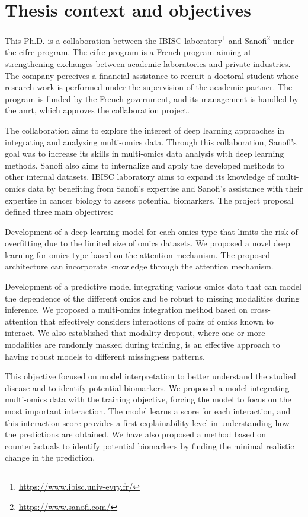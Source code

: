 \documentclass[../main.tex]{subfiles}
\begin{document}
\section{Thesis context and objectives}
	This Ph.D. is a collaboration between the IBISC laboratory\footnote{\url{https://www.ibisc.univ-evry.fr/}} and Sanofi\footnote{\url{https://www.sanofi.com/}} under the \gls{cifre} program.
	The \gls{cifre} program is a French program aiming at strengthening exchanges between academic laboratories and private industries.
	The company perceives a financial assistance to recruit a doctoral student whose research work is performed under the supervision of the academic partner.
	The program is funded by the French government, and its management is handled by the \gls{anrt}, which approves the collaboration project.

	The collaboration aims to explore the interest of deep learning approaches in integrating and analyzing multi-omics data.
	Through this collaboration, Sanofi's goal was to increase its skills in multi-omics data analysis with deep learning methods.
	Sanofi also aims to internalize and apply the developed methods to other internal datasets.
	IBISC laboratory aims to expand its knowledge of multi-omics data by benefiting from Sanofi's expertise and Sanofi's assistance with their expertise in cancer biology to assess potential biomarkers.
	The project proposal defined three main objectives:
	\begin{description}[
			style=multiline,
			leftmargin=!,
			labelwidth=2cm
		]
		\item[First objective]
			Development of a deep learning model for each omics type that limits the risk of overfitting due to the limited size of omics datasets.
			We proposed a novel deep learning for omics type based on the attention mechanism.
			The proposed architecture can incorporate knowledge through the attention mechanism.
		\item[Second objective]
			Development of a predictive model integrating various omics data that can model the dependence of the different omics and be robust to missing modalities during inference.
			We proposed a multi-omics integration method based on cross-attention that effectively considers interactions of pairs of omics known to interact.
			We also established that modality dropout, where one or more modalities are randomly masked during training, is an effective approach to having robust models to different missingness patterns.
		\item[Third objective]
			This objective focused on model interpretation to better understand the studied disease and to identify potential biomarkers.
			We proposed a model integrating multi-omics data with the training objective, forcing the model to focus on the most important interaction.
			The model learns a score for each interaction, and this interaction score provides a first explainability level in understanding how the predictions are obtained.
			We have also proposed a method based on counterfactuals to identify potential biomarkers by finding the minimal realistic change in the prediction.
	\end{description}
	\clearpage
\end{document}
